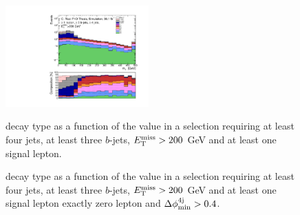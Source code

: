 \begin{figure}[h!]
\centering 
\includegraphics[width=0.49\textwidth]{figures/susy_common/mc_stack_mT_1L_3b_tt_dec.pdf}
\caption{\ttbar decay type as a function of the \mt value  in a selection requiring at least four jets, at least three $b$-jets, $E_{\rm T}^{\mathrm{miss}}>200$ GeV and at least one signal lepton.}\label{fig:ttbar_decay_mT_1L}

\caption{\ttbar decay type as a function of the \mtb value  in a selection requiring at least four jets, at least three $b$-jets, $E_{\rm T}^{\mathrm{miss}}>200$ GeV and  at least one signal lepton  exactly zero lepton and $\Delta\phi_{\rm{min}}^{4{\rm{j}}} > 0.4$.}\label{fig:ttbar_decay_mTb_min}
\end{figure}

